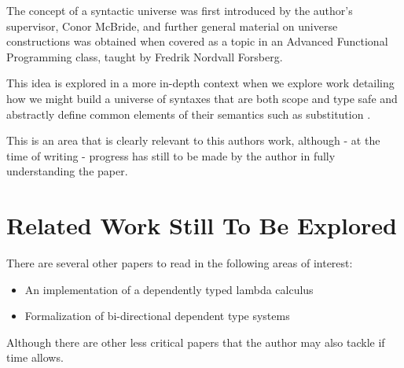The concept of a syntactic universe was first introduced by
the author's supervisor, Conor McBride, and further general
material on universe constructions was obtained when covered
as a topic in an Advanced Functional Programming class, taught
by Fredrik Nordvall Forsberg.

This idea is explored in a more in-depth context when we
explore work detailing how we might build a universe of
syntaxes that are both scope and type safe and abstractly
define common elements of their semantics such as
substitution \cite{DBLP:journals/corr/abs-2001-11001}.

This is an area that is clearly relevant to this authors
work, although - at the time of writing - progress has still
to be made by the author in fully understanding the paper.

\section{Related Work Still To Be Explored}

There are several other papers to read in the following
areas of interest:

\begin{itemize}
\item An implementation of a dependently typed lambda
  calculus \cite{ATutorialImplementationOfDTLC}
\item Formalization of bi-directional dependent type systems \cite{TypesWhoSayNi}
\end{itemize}

Although there are other less critical papers that the
author may also tackle if time allows.
